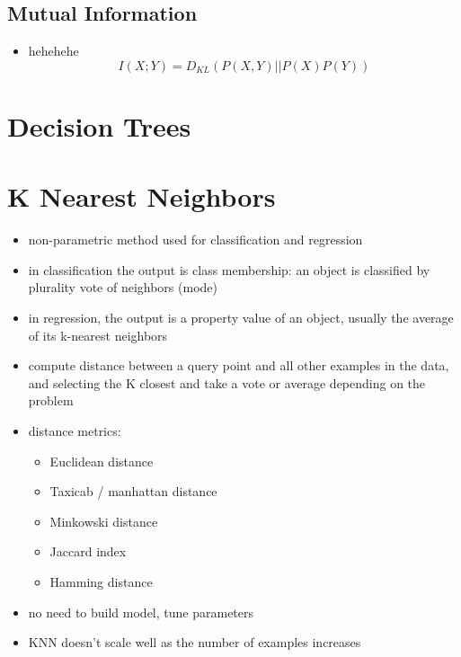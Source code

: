 \documentclass[../main.tex]{subfiles}
\begin{document}

\subsection{Mutual Information} %
\label{sub:mutual_information}
  \begin{itemize}
    \item hehehehe
    \begin{equation*}
      I(X;Y) = D_{KL}(P(X, Y) || P(X)P(Y))
    \end{equation*}
  \end{itemize}

\section{Decision Trees} %
\label{sec:decision_trees}


\section{K Nearest Neighbors} %
\begin{itemize}
  \item non-parametric method used for classification and regression
  \item in classification the output is class membership: an object is classified by plurality vote of neighbors (mode)
  \item in regression, the output is a property value of an object, usually the average of its k-nearest neighbors
  \item compute distance between a query point and all other examples in the data, and selecting the K closest and take a vote or average depending on the problem
  \item distance metrics:
  \begin{itemize}
    \item Euclidean distance
    \item Taxicab / manhattan distance
    \item Minkowski distance
    \item Jaccard index
    \item Hamming distance
  \end{itemize}
  \item no need to build model, tune parameters
  \item KNN doesn't scale well as the number of examples increases
\end{itemize}
\label{sec:knn}
\end{document}
